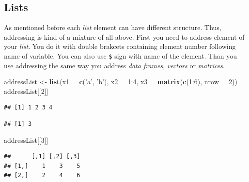 \documentclass[]{book}
\newenvironment{Shaded}{\begin{snugshade}}{\end{snugshade}}
\newcommand{\KeywordTok}[1]{\textcolor[rgb]{0.12,0.11,0.11}{\textbf{#1}}}
\newcommand{\DataTypeTok}[1]{\textcolor[rgb]{0.00,0.34,0.68}{#1}}
\newcommand{\DecValTok}[1]{\textcolor[rgb]{0.69,0.50,0.00}{#1}}
\newcommand{\StringTok}[1]{\textcolor[rgb]{0.75,0.01,0.01}{#1}}
\newcommand{\OperatorTok}[1]{\textcolor[rgb]{0.12,0.11,0.11}{#1}}
\newcommand{\NormalTok}[1]{\textcolor[rgb]{0.12,0.11,0.11}{#1}}
\theoremstyle{definition}
\theoremstyle{definition}
\theoremstyle{definition}
\theoremstyle{remark}
\begin{document}
\subsection{Lists}\label{lists}

As mentioned before each \emph{list} element can have different
structure. Thus, addressing is kind of a mixture of all above. First you
need to address element of your \emph{list}. You do it with double
brakcets containing element number following name of variable. You can
also use \texttt{\$} sign with name of the element. Than you use
addressing the same way you address \emph{data frames}, \emph{vectors}
or \emph{matrices}.

\begin{Shaded}
\begin{Highlighting}[]
\NormalTok{addressList <-}\StringTok{ }\KeywordTok{list}\NormalTok{(}\DataTypeTok{x1 =} \KeywordTok{c}\NormalTok{(}\StringTok{'a'}\NormalTok{, }\StringTok{'b'}\NormalTok{), }\DataTypeTok{x2 =} \DecValTok{1}\OperatorTok{:}\DecValTok{4}\NormalTok{, }\DataTypeTok{x3 =} \KeywordTok{matrix}\NormalTok{(}\KeywordTok{c}\NormalTok{(}\DecValTok{1}\OperatorTok{:}\DecValTok{6}\NormalTok{), }\DataTypeTok{nrow =} \DecValTok{2}\NormalTok{))}
\NormalTok{addressList[[}\DecValTok{2}\NormalTok{]]}
\end{Highlighting}
\end{Shaded}

\begin{verbatim}
## [1] 1 2 3 4
\end{verbatim}

\begin{Shaded}
\end{Shaded}

\begin{verbatim}
## [1] 3
\end{verbatim}

\begin{Shaded}
\begin{Highlighting}[]
\NormalTok{addressList[[}\DecValTok{3}\NormalTok{]]}
\end{Highlighting}
\end{Shaded}

\begin{verbatim}
##      [,1] [,2] [,3]
## [1,]    1    3    5
## [2,]    2    4    6
\end{verbatim}
\end{document}
